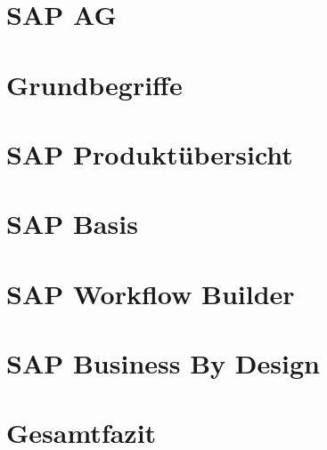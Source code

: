 \documentclass[11pt,pdftex,a4paper,oneside]{scrreprt}
\begin{document}







\tableofcontents
\listoffigures
\listoftables

\chapter{SAP AG} \label{chap:sap}


\chapter{Grundbegriffe}  \label{chap:grundbegriffe}


\chapter{SAP Produktübersicht}  \label{chap:sap-produkte}


\chapter{SAP Basis}  \label{chap:sap-basis}


\chapter{SAP Workflow Builder}  \label{chap:builder}


\chapter{SAP Business By Design}  \label{chap:byd}


\chapter{Gesamtfazit}  \label{chap:fazit}


\printglossary[type=\acronymtype]
\newpage
\printglossary[type=main]

\vspace{-1.0cm}





\end{document}
